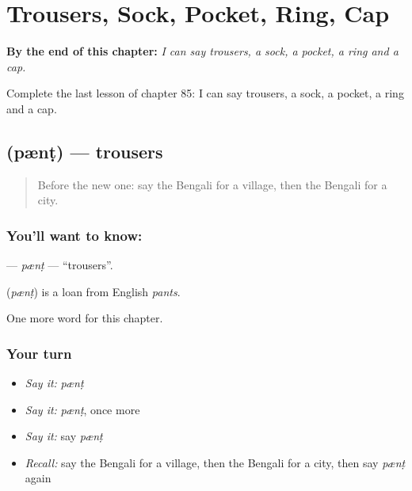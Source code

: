 
\chapter{Trousers, Sock, Pocket, Ring, Cap}
\label{ch:bn-trousers-sock-pocket-ring-cap}

\begin{chapteropening}
\textbf{By the end of this chapter:} \emph{I can say trousers, a sock, a pocket, a ring and a cap.}

Complete the last lesson of chapter 85: I can say trousers, a sock, a pocket, a ring and a cap.
\end{chapteropening}

\section[\texorpdfstring{\bn{প্যান্ট} (pænṭ)}{প্যান্ট (pænṭ)}]{ (pænṭ) — trousers}

\label{lesson:BN-C85-pnt}



\begin{quote}
Before the new one: say the Bengali for a village, then the Bengali for a city.
\end{quote}

\subsection*{You'll want to know: }
\textbf{} — \emph{pænṭ} — \textquotedblleft{}trousers\textquotedblright{}.

\begin{cousinweb}
\textbf{} (\emph{pænṭ}) is a loan from English \emph{pants}.
\end{cousinweb}

\begin{grammarlens}[title={What you've built}]
One more word for this chapter.
\end{grammarlens}

\subsection*{Your turn}
\begin{itemize}
\raggedright
  \item \emph{Say it:} \emph{pænṭ}
  \item \emph{Say it:} \emph{pænṭ}, once more
  \item \emph{Say it:} say \emph{pænṭ}
  \item \emph{Recall:} say the Bengali for a village, then the Bengali for a city, then say \emph{pænṭ} again
\end{itemize}


